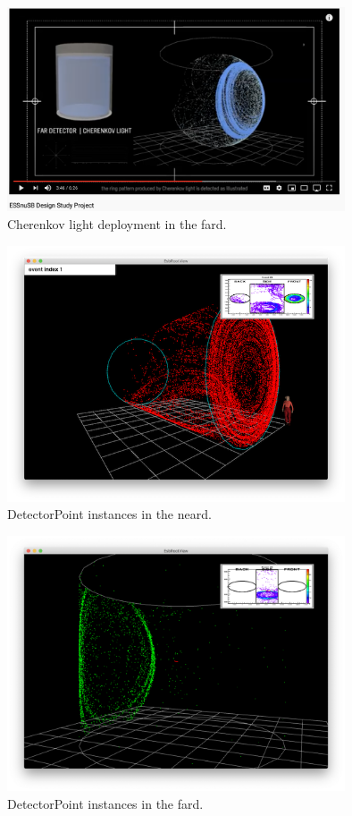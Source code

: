 \begin{figure}[ht]
\centering
\includegraphics[width=10cm,clip]{youtube_fard}
\caption{Cherenkov light deployment in the fard.}
\label{fig-youtube-fard}
\end{figure}

\begin{figure}[ht]
\centering
\includegraphics[width=10cm,clip]{layout_event_1}
\caption{DetectorPoint instances in the neard.}
\label{fig-layout-event-1}
\end{figure}

\begin{figure}[ht]
\centering
\includegraphics[width=10cm,clip]{fard_setup}
\caption{DetectorPoint instances in the fard.}
\label{fig-fard-setup}
\end{figure}

